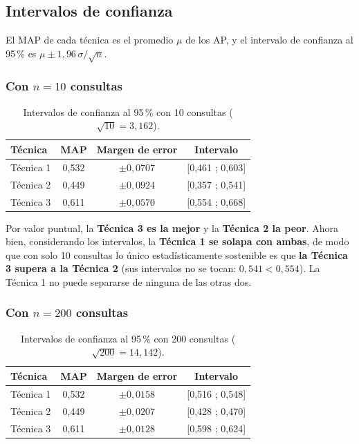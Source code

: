 \documentclass[11pt, a4paper]{article}
\begin{document}
\subsection{Intervalos de confianza}

El MAP de cada técnica es el promedio $\mu$ de los AP, y el intervalo de confianza al 95\,\% es
$\mu \pm 1{,}96\,\sigma/\sqrt{n}$.

\subsubsection{Con $n = 10$ consultas}

\begin{table}[H]
\centering
\caption{Intervalos de confianza al 95\,\% con 10 consultas ($\sqrt{10} = 3{,}162$).}
\small
\renewcommand{\arraystretch}{1.25}
\begin{tabular}{@{}lccc@{}}
\toprule
\textbf{Técnica} & \textbf{MAP} & \textbf{Margen de error} & \textbf{Intervalo} \\
\midrule
Técnica 1 & 0,532 & $\pm 0{,}0707$ & [0,461 ; 0,603] \\
Técnica 2 & 0,449 & $\pm 0{,}0924$ & [0,357 ; 0,541] \\
Técnica 3 & 0,611 & $\pm 0{,}0570$ & [0,554 ; 0,668] \\
\bottomrule
\end{tabular}
\end{table}

Por valor puntual, la \textbf{Técnica 3 es la mejor} y la \textbf{Técnica 2 la peor}. Ahora bien,
considerando los intervalos, la \textbf{Técnica 1 se solapa con ambas}, de modo que con solo 10
consultas lo único estadísticamente sostenible es que \textbf{la Técnica 3 supera a la Técnica 2}
(sus intervalos no se tocan: $0{,}541 < 0{,}554$). La Técnica 1 no puede separarse de ninguna de las
otras dos.

\subsubsection{Con $n = 200$ consultas}

\begin{table}[H]
\centering
\caption{Intervalos de confianza al 95\,\% con 200 consultas ($\sqrt{200} = 14{,}142$).}
\small
\renewcommand{\arraystretch}{1.25}
\begin{tabular}{@{}lccc@{}}
\toprule
\textbf{Técnica} & \textbf{MAP} & \textbf{Margen de error} & \textbf{Intervalo} \\
\midrule
Técnica 1 & 0,532 & $\pm 0{,}0158$ & [0,516 ; 0,548] \\
Técnica 2 & 0,449 & $\pm 0{,}0207$ & [0,428 ; 0,470] \\
Técnica 3 & 0,611 & $\pm 0{,}0128$ & [0,598 ; 0,624] \\
\bottomrule
\end{tabular}
\end{table}
\end{document}
